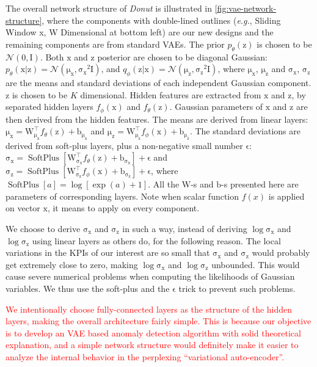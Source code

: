\documentclass[sigconf]{acmart}
\newcommand\compactdel[1]{{\textcolor{red}{#1}}}
\newcommand\compactdel[1]{}
\newcommand\compactdel[1]{#1}
\newcommand{\DONUT}{\textit{Donut}}
\newcommand{\EG}{\textit{e.g.}}
\newcommand{\vv}[1]{\bm{\mathrm{{#1}}}}
\begin{document}
The overall network structure of \DONUT{} is illustrated in \cref{fig:vae-network-structure}, where the components with double-lined outlines (\EG, Sliding Window x, W Dimensional at bottom left) are our new designs and the remaining components are from standard VAEs.
The prior $p_{\theta}(\vv{z})$ is chosen to be $\mathcal{N}(\vv{0},\vv{I})$.
Both $\vv{x}$ and $\vv{z}$ posterior are chosen to be diagonal Gaussian: $p_{\theta}(\vv{x}|\vv{z}) = \mathcal{N}(\vv{\mu_x},\vv{\sigma_x}^2\vv{I})$, and $q_{\phi}(\vv{z}|\vv{x}) = \mathcal{N}(\vv{\mu_z},\vv{\sigma_z}^2\vv{I})$, where $\vv{\mu_x}$, $\vv{\mu_z}$ and $\vv{\sigma_x}$, $\vv{\sigma_z}$ are the means and standard deviations of each independent Gaussian component.
$\vv{z}$ is chosen to be $K$ dimensional.
Hidden features are extracted from $\vv{x}$ and $\vv{z}$, by separated hidden layers $f_{\phi}(\vv{x})$ and $f_{\theta}(\vv{z})$.
Gaussian parameters of $\vv{x}$ and $\vv{z}$ are then derived from the hidden features.
The means are derived from linear layers: $\vv{\mu_x} = \vv{W}^{\top}_{\vv{\mu_x}}f_{\theta}(\vv{z})+\vv{b_{\mu_x}}$ and $\vv{\mu_z} = \vv{W}^{\top}_{\vv{\mu_z}}f_{\phi}(\vv{x})+\vv{b_{\mu_z}}$.
The standard deviations are derived from soft-plus layers, plus a non-negative small number $\vv{\epsilon}$: $\vv{\sigma_x} = \operatorname{SoftPlus}[\vv{W}^{\top}_{\vv{\sigma_x}}f_{\theta}(\vv{z})+\vv{b_{\sigma_x}}] + \vv{\epsilon}$ and $\vv{\sigma_z} = \operatorname{SoftPlus}[\vv{W}^{\top}_{\vv{\sigma_z}}f_{\phi}(\vv{x})+\vv{b_{\sigma_z}}] + \vv{\epsilon}$, where $\operatorname{SoftPlus}[a] = \log [\exp (a) + 1]$.
All the $\vv{W}$-s and $\vv{b}$-s presented here are parameters of corresponding layers.
Note when scalar function $f(x)$ is applied on vector $\vv{x}$, it means to apply on every component.

We choose to derive $\vv{\sigma_x}$ and $\vv{\sigma_z}$ in such a way, instead of deriving $\log \vv{\sigma_x}$ and $\log \vv{\sigma_z}$ using linear layers as others do, for the following reason. The local variations in the KPIs of our interest are so small that $\vv{\sigma_x}$ and $\vv{\sigma_z}$ would probably get extremely close to zero, making $\log \vv{\sigma_x}$ and $\log \vv{\sigma_z}$ unbounded. This would cause severe numerical problems when computing the likelihoods of Gaussian variables.
We thus use the soft-plus and the $\vv{\epsilon}$ trick to prevent such problems.

\compactdel{We intentionally choose fully-connected layers as the structure of the hidden layers, making the overall architecture fairly simple. This is because our objective is to develop an VAE based anomaly detection algorithm with solid theoretical explanation, and a simple network structure would definitely make it easier to analyze the internal behavior in the perplexing ``variational auto-encoder''.}
\end{document}
